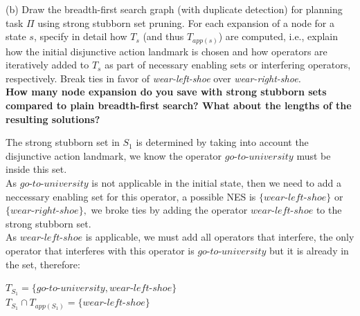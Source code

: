 \documentclass[11pt,a4paper]{article}
\begin{document}
(b) Draw the breadth-first search graph (with duplicate detection) for planning task $\Pi$ using
strong stubborn set pruning. For each expansion of a node for a state $s$, specify in detail how
$T_s$ (and thus $T_{app(s)}$) are computed, i.e., explain how the initial disjunctive action landmark
is chosen and how operators are iteratively added to $T_s$ as part of necessary enabling sets or
interfering operators, respectively. Break ties in favor of \emph{wear-left-shoe} over \emph{wear-right-shoe.}\\

\textbf{How many node expansion do you save with strong stubborn sets compared to plain breadth-first search?
 What about the lengths of the resulting solutions?}\\

\begin{center}
\end{center}

The strong stubborn set in $S_1$ is determined by taking into account the disjunctive action landmark, we know the operator $go$-$to$-$university$ must be inside this set.\\
As $go$-$to$-$university$ is not applicable in the initial state, then we need to add a neccessary enabling set for this operator, a possible NES is $\{wear$-$left$-$shoe\}$ or $\{wear$-$right$-$shoe\},$ we broke ties by adding the operator $wear$-$left$-$shoe$ to the strong stubborn set.\\
As $wear$-$left$-$shoe$ is applicable, we must add all operators that interfere, the only operator that interferes with this operator is $go$-$to$-$university$ but it is already in the set, therefore:
\begin{center}
	$T_{S_1} = \{go$-$to$-$university, wear$-$left$-$shoe\}$\\
	$T_{S_1} \cap T_{app(S_1)} = \{wear$-$left$-$shoe\}$
\end{center}
\end{document}
